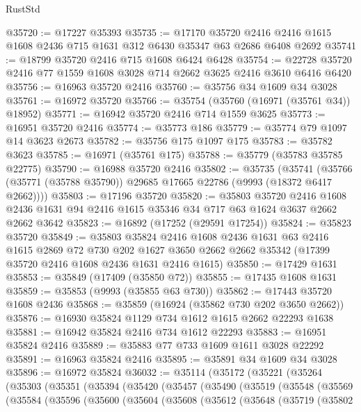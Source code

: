 \begin{lexlean}{RustStd}
\begin{coremodule}
@35720 := @17227 @35393
@35735 := @17170
    @35720
    @2416
    @2416
    @1615
    @1608
    @2436
    @715
    @1631
    @312
    @6430
    @35347
    @63
    @2686
    @6408
    @2692
@35741 := @18799 @35720 @2416 @715 @1608 @6424 @6428
@35754 := @22728 @35720 @2416 @77 @1559 @1608 @3028 @714 @2662 @3625 @2416 @3610 @6416 @6420
@35756 := @16963 @35720 @2416
@35760 := @35756 @34 @1609 @34 @3028
@35761 := @16972 @35720
@35766 := @35754 (@35760 (@16971 (@35761 @34)) @18952)
@35771 := @16942 @35720 @2416 @714 @1559 @3625
@35773 := @16951 @35720 @2416
@35774 := @35773 @186
@35779 := @35774 @79 @1097 @14 @3623 @2673
@35782 := @35756 @175 @1097 @175
@35783 := @35782 @3623
@35785 := @16971 (@35761 @175)
@35788 := @35779 (@35783 @35785 @22775)
@35790 := @16988 @35720 @2416
@35802 := @35735
    (@35741 (@35766 (@35771 (@35788 @35790)) @29685 @17665 @22786 (@9993 (@18372 @6417 @2662))))
@35803 := @17196 @35720
@35820 := @35803
    @35720
    @2416
    @1608
    @2436
    @1631
    @94
    @2416
    @1615
    @35346
    @34
    @717
    @63
    @1624
    @3637
    @2662
    @2662
    @3642
@35823 := @16892 (@17252 (@29591 @17254))
@35824 := @35823 @35720
@35849 := @35803
    @35824
    @2416
    @1608
    @2436
    @1631
    @63
    @2416
    @1615
    @2869
    @72
    @730
    @202
    @1627
    @3650
    @2662
    @2662
    @35342
    (@17399 @35720 @2416 @1608 @2436 @1631 @2416 @1615)
@35850 := @17429 @1631
@35853 := @35849 (@17409 (@35850 @72))
@35855 := @17435 @1608 @1631
@35859 := @35853 (@9993 (@35855 @63 @730))
@35862 := @17443 @35720 @1608 @2436
@35868 := @35859 (@16924 (@35862 @730 @202 @3650 @2662))
@35876 := @16930 @35824 @1129 @734 @1612 @1615 @2662 @22293 @1638
@35881 := @16942 @35824 @2416 @734 @1612 @22293
@35883 := @16951 @35824 @2416
@35889 := @35883 @77 @733 @1609 @1611 @3028 @22292
@35891 := @16963 @35824 @2416
@35895 := @35891 @34 @1609 @34 @3028
@35896 := @16972 @35824
@36032 := @35114
    (@35172
      (@35221
        (@35264
          (@35303
            (@35351
              (@35394
                (@35420
                  (@35457
                    (@35490
                      (@35519
                        (@35548
                          (@35569
                            (@35584
                              (@35596
                                (@35600
                                  (@35604
                                    (@35608
                                      (@35612
                                        (@35648
                                          (@35719
                                            (@35802

\end{coremodule}
\end{lexlean}
